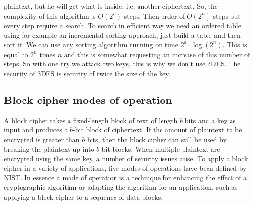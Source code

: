 \documentclass[11pt]{article}
\begin{document}
plaintext, but he will get what is inside, i.e. another ciphertext. So, the complexity of this algorithm is $O(2^n)$ steps. Then order of $O(2^n)$ steps but every step require a search. To search in efficient way we need an ordered table using for example an incremental sorting approach, just build a table and then sort it. We can use any sorting algorithm running on time $2^n \cdot \log(2^n)$. This is equal to $2^n$ times $n$ and this is somewhat requesting an increase of this number of steps. So with one try we attack two keys, this is why we don't use 2DES. The security of 3DES is security of twice the size of the key.
\subsection{Block cipher modes of operation}
A block cipher takes a fixed-length block of text of length $b$ bits and a key as input and produces a $b$-bit block of ciphertext. If the amount of plaintext to be encrypted is greater than $b$ bits, then the block cipher can still be used by breaking the plaintext up into $b$-bit blocks. When multiple plaintext are encrypted using the same key, a number of security issues arise. To apply a block cipher in a variety of applications, five modes of operations have been defined by NIST. In essence a mode of operation is a technique for enhancing the effect of a cryptographic algorithm or adapting the algorithm for an application, such as applying a block cipher to a sequence of data blocks.
\end{document}
